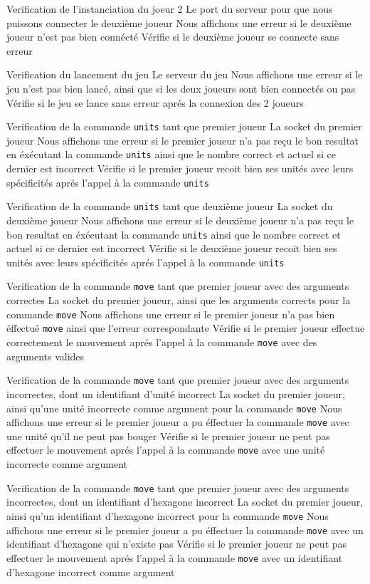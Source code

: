 \mytest
{Verification de l'instanciation du joeur 2}
{Le port du serveur pour que nous puissons connecter le deuxième joueur}
{Nous affichons une erreur si le deuxième joueur n'est pas bien connécté}
{Vérifie si le deuxième joueur se connecte sans erreur}

\mytest
{Verification du lancement du jeu}
{Le serveur du jeu}
{Nous affichons une erreur si le jeu n'est pas bien lancé, ainsi que si les deux joueurs sont bien connectés ou pas}
{Vérifie si le jeu se lance sans erreur aprés la connexion des 2 joueurs}

\mytest
{Verification de la commande {\tt units} tant que premier joueur}
{La socket du premier joueur}
{Nous affichons une erreur si le premier joueur n'a pas reçu le bon resultat en éxécutant la commande {\tt units} ainsi que le nombre correct et actuel si ce dernier est incorrect}
{Vérifie si le premier joueur recoit bien ses unités avec leurs spécificités aprés l'appel à la commande {\tt units}}

\mytest
{Verification de la commande {\tt units} tant que deuxième joueur}
{La socket du deuxième joueur}
{Nous affichons une erreur si le deuxième joueur n'a pas reçu le bon resultat en éxécutant la commande {\tt units} ainsi que le nombre correct et actuel si ce dernier est incorrect}
{Vérifie si le deuxième joueur recoit bien ses unités avec leurs spécificités aprés l'appel à la commande {\tt units}}

\mytest
{Verification de la commande {\tt move} tant que premier joueur avec des arguments correctes}
{La socket du premier joueur, ainsi que les arguments corrects pour la commande {\tt move}}
{Nous affichons une erreur si le premier joueur n'a pas bien éffectué {\tt move} ainsi que l'erreur correspondante}
{Vérifie si le premier joueur effectue correctement le mouvement aprés l'appel à la commande {\tt move} avec des arguments valides}

\mytest
{Verification de la commande {\tt move} tant que premier joueur avec des arguments incorrectes, dont un identifiant d'unité incorrect}
{La socket du premier joueur, ainsi qu'une unité incorrecte comme argument pour la commande {\tt move}}
{Nous affichons une erreur si le premier joueur a pu éffectuer la commande {\tt move} avec une unité qu'il ne peut pas bouger}
{Vérifie si le premier joueur ne peut pas effectuer le mouvement aprés l'appel à la commande {\tt move} avec une unité incorrecte comme argument}

\mytest
{Verification de la commande {\tt move} tant que premier joueur avec des arguments incorrectes, dont un identifiant d'hexagone incorrect}
{La socket du premier joueur, ainsi qu'un identifiant d'hexagone incorrect pour la commande {\tt move}}
{Nous affichons une erreur si le premier joueur a pu éffectuer la commande {\tt move} avec un identifiant d'hexagone qui n'existe pas}
{Vérifie si le premier joueur ne peut pas effectuer le mouvement aprés l'appel à la commande {\tt move} avec un identifiant d'hexagone incorrect comme argument}

